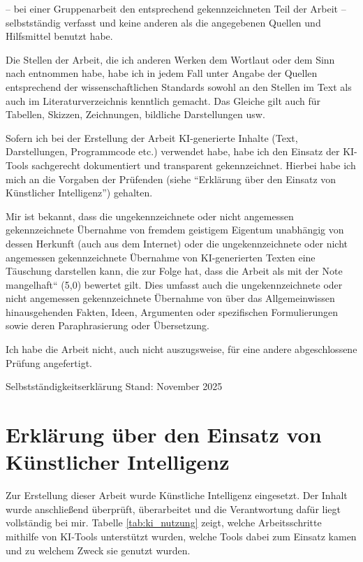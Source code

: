 \noindent
{\small– bei einer Gruppenarbeit den entsprechend gekennzeichneten Teil der Arbeit – selbstständig verfasst und keine anderen als die angegebenen Quellen und Hilfsmittel benutzt habe.

\noindent
Die Stellen der Arbeit, die ich anderen Werken dem Wortlaut oder dem Sinn nach entnommen habe, habe ich in jedem Fall unter Angabe der Quellen entsprechend der wissenschaftlichen Standards sowohl an den Stellen im Text als auch im Literaturverzeichnis kenntlich gemacht. Das Gleiche gilt auch für Tabellen, Skizzen, Zeichnungen, bildliche Darstellungen usw.

\noindent
Sofern ich bei der Erstellung der Arbeit KI-generierte Inhalte (Text, Darstellungen, Programmcode etc.) verwendet habe, habe ich den Einsatz der KI-Tools sachgerecht dokumentiert und transparent gekennzeichnet. Hierbei habe ich mich an die Vorgaben der Prüfenden (siehe ``Erklärung über den Einsatz von Künstlicher Intelligenz'') gehalten.

\noindent
Mir ist bekannt, dass die ungekennzeichnete oder nicht angemessen gekennzeichnete Übernahme von fremdem geistigem Eigentum unabhängig von dessen Herkunft (auch aus dem Internet) oder die ungekennzeichnete oder nicht angemessen gekennzeichnete Übernahme von KI-generierten Texten eine Täuschung darstellen kann, die zur Folge hat, dass die Arbeit als mit der Note \quotedblbase mangelhaft\textquotedblleft{} (5,0) bewertet gilt. Dies umfasst auch die ungekennzeichnete oder nicht angemessen gekennzeichnete Übernahme von über das Allgemeinwissen hinausgehenden Fakten, Ideen, Argumenten oder spezifischen Formulierungen sowie deren Paraphrasierung oder Übersetzung.

\noindent
Ich habe die Arbeit nicht, auch nicht auszugsweise, für eine andere abgeschlossene Prüfung angefertigt.}

\medskip

\noindent
{}%
\hfill
{}

\noindent
{\tiny Selbstständigkeitserklärung \textperiodcentered{} Stand: November 2025}

\noindent
\section*{Erklärung über den Einsatz von Künstlicher Intelligenz}

Zur Erstellung dieser Arbeit wurde Künstliche Intelligenz eingesetzt.
Der Inhalt wurde anschließend überprüft, überarbeitet und die Verantwortung dafür liegt vollständig bei mir. Tabelle \ref{tab:ki_nutzung} zeigt, welche Arbeitsschritte mithilfe von KI‑Tools unterstützt wurden, welche Tools dabei zum Einsatz kamen und zu welchem Zweck sie genutzt wurden.

